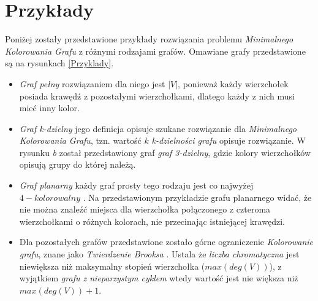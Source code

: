 \clearpage


\section{Przykłady}
Poniżej zostały przedstawione przykłady rozwiązania problemu \textit{Minimalnego Kolorowania Grafu} z
 różnymi rodzajami grafów. Omawiane grafy przedstawione są na rysunkach \ref{Przyklady}.

 \begin{itemize}
    \item \textit{Graf pełny} rozwiązaniem dla niego jest $|V|$, ponieważ każdy wierzchołek posiada krawędź z
     pozostałymi wierzchołkami, dlatego każdy z nich musi mieć inny kolor.
    \item \textit{Graf k-dzielny} jego definicja opisuje szukane rozwiązanie dla \textit{Minimalnego Kolorowania Grafu}, tzn. wartość $k$  \textit{k-dzielności grafu} opisuje rozwiązanie. W rysunku \textit{b} został przedstawiony graf \textit{graf 3-dzielny}, gdzie kolory wierzchołków opisują grupy do której należą.
    \item \textit{Graf planarny} każdy graf prosty tego rodzaju jest co najwyżej $4-kolorowalny$ \cite{4colorable}. Na przedstawionym przykładzie grafu planarnego widać, że nie można znaleźć miejsca dla wierzchołka połączonego z czteroma wierzchołkami o różnych kolorach, nie przecinając istniejącej krawędzi.
    \item Dla pozostałych grafów przedstawione zostało górne ograniczenie \textit{Kolorowanie grafu}, znane jako \textit{Twierdzenie Brooksa} \cite{brooks_1941}. 
    Ustala że \textit{liczba chromatyczna} jest niewiększa niż maksymalny stopień wierzchołka ($max(deg(V))$), z wyjątkiem
     \textit{grafu z nieparzystym cyklem} wtedy wartość jest nie większa niż $max(deg(V)) + 1$.
\end{itemize}


